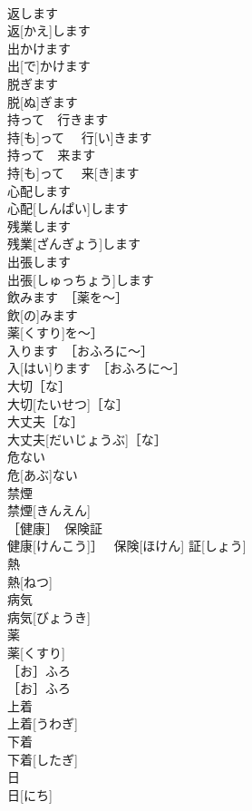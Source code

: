 \documentclass[8pt]{extreport}
\begin{document}
\begin{CJK}{UTF8}{min}
\\	返します	
\\	返[かえ]します	
\\	出かけます	
\\	出[で]かけます	
\\	脱ぎます	
\\	脱[ぬ]ぎます	
\\	持って　行きます	
\\	持[も]って　 行[い]きます	
\\	持って　来ます	
\\	持[も]って　 来[き]ます	
\\	心配します	
\\	心配[しんぱい]します	
\\	残業します	
\\	残業[ざんぎょう]します	
\\	出張します	
\\	出張[しゅっちょう]します	
\\	飲みます　［薬を〜］	
\\	飲[の]みます　
\\	薬[くすり]を〜］	
\\	入ります　［おふろに〜］	
\\	入[はい]ります　［おふろに〜］	
\\	大切［な］	
\\	大切[たいせつ]［な］	
\\	大丈夫［な］	
\\	大丈夫[だいじょうぶ]［な］	
\\	危ない	
\\	危[あぶ]ない	
\\	禁煙	
\\	禁煙[きんえん]	
\\	［健康］　保険証	
\\	健康[けんこう]］　 保険[ほけん] 証[しょう]	
\\	熱	
\\	熱[ねつ]	
\\	病気	
\\	病気[びょうき]	
\\	薬	
\\	薬[くすり]	
\\	［お］ふろ	
\\	［お］ふろ	
\\	上着	
\\	上着[うわぎ]	
\\	下着	
\\	下着[したぎ]	
\\	日	
\\	日[にち]	

\end{CJK}
\end{document}
